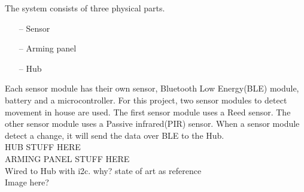 The system consists of three physical parts.
\begin{itemize}
	\item[--]Sensor
	\item[--]Arming panel
	\item[--]Hub
\end{itemize} 

Each sensor module has their own sensor, Bluetooth Low Energy(BLE) module, battery and a microcontroller. For this project, two sensor modules to detect movement in house are used. The first sensor module uses a Reed sensor. The other sensor module uses a Passive infrared(PIR) sensor. 
When a sensor module detect a change, it will send the data over BLE to the Hub.\\
HUB STUFF HERE \\
ARMING PANEL STUFF HERE \\
Wired to Hub with i2c. why? state of art as reference\\
Image here? 
